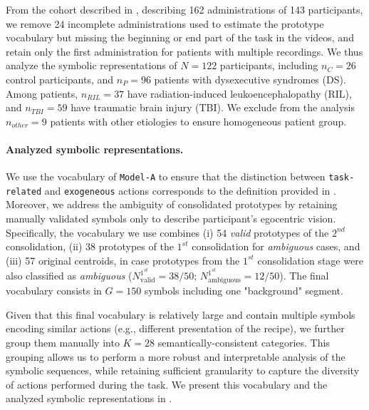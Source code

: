 \begin{chapterabstract}
        From the cohort described in , describing 162 administrations of 143 participants, we remove 24 incomplete administrations used to estimate the prototype vocabulary but missing the beginning or end part of the task in the videos, and retain only the first administration for patients with multiple recordings. We thus analyze the symbolic representations of $N=122$ participants, including $n_C=26$ control participants, and $n_P=96$ patients with dysexecutive syndromes (DS). Among patients, $n_{RIL}=37$ have radiation-induced leukoencephalopathy (RIL), and $n_{TBI}=59$ have traumatic brain injury (TBI). We exclude from the analysis $n_{other}=9$ patients with other etiologies to ensure homogeneous patient group. %


    \paragraph{Analyzed symbolic representations.\\}

    We use the vocabulary of \texttt{Model-A} to ensure that the distinction between \texttt{task-related} and \texttt{exogeneous} actions corresponds to the definition provided in . Moreover, we address the ambiguity of consolidated prototypes by retaining manually validated symbols only to describe participant's egocentric vision. Specifically, the vocabulary we use combines (i) 54 \textit{valid} prototypes of the $2^{nd}$ consolidation, (ii) 38 prototypes of the $1^{st}$ consolidation for \textit{ambiguous} cases, and (iii) 57 original centroids, in case prototypes from the $1^{st}$ consolidation stage were also classified as \textit{ambiguous} ($N^{1^{st}}_{\text{valid}} = 38/50$; $N^{1^{st}}_{\text{ambiguous}} = 12/50$). The final vocabulary consists in $G=150$ symbols including one "background" segment.

    Given that this final vocabulary is relatively large and contain multiple symbols encoding similar actions (e.g., different presentation of the recipe), we further group them manually into $K=28$ semantically-consistent categories. This grouping allows us to perform a more robust and interpretable analysis of the symbolic sequences, while retaining sufficient granularity to capture the diversity of actions performed during the task. We present this vocabulary and the analyzed symbolic representations in .


\end{chapterabstract}
